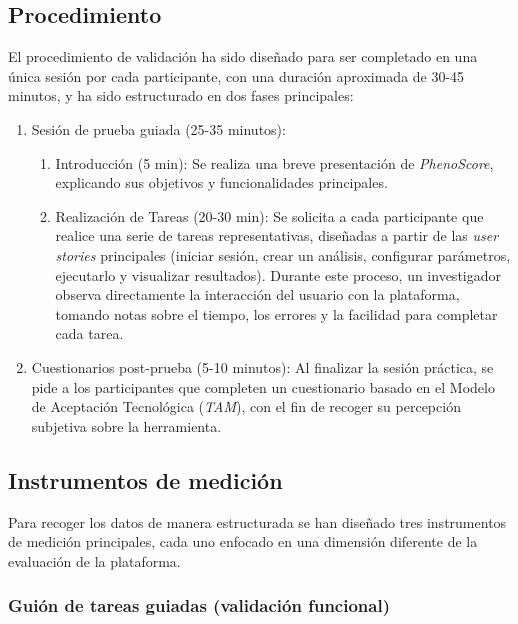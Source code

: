 \subsection{Procedimiento}

El procedimiento de validación ha sido diseñado para ser completado en una única sesión por cada participante, con una duración aproximada de 30-45 minutos, y ha sido estructurado en dos fases principales:

\begin{enumerate}
    \item Sesión de prueba guiada (25-35 minutos):
    \begin{enumerate}
    \item Introducción (5 min): Se realiza una breve presentación de \textit{PhenoScore}, explicando sus objetivos y funcionalidades principales.
    \item Realización de Tareas (20-30 min): Se solicita a cada participante que realice una serie de tareas representativas, diseñadas a partir de las \textit{user stories} principales (iniciar sesión, crear un análisis, configurar parámetros, ejecutarlo y visualizar resultados). Durante este proceso, un investigador observa directamente la interacción del usuario con la plataforma, tomando notas sobre el tiempo, los errores y la facilidad para completar cada tarea.
    \end{enumerate}
    \item Cuestionarios post-prueba (5-10 minutos):
    Al finalizar la sesión práctica, se pide a los participantes que completen un cuestionario basado en el Modelo de Aceptación Tecnológica (\textit{TAM}), con el fin de recoger su percepción subjetiva sobre la herramienta.
\end{enumerate}


\subsection{Instrumentos de medición}

Para recoger los datos de manera estructurada se han diseñado tres instrumentos de medición principales, cada uno enfocado en una dimensión diferente de la evaluación de la plataforma.

\subsubsection{Guión de tareas guiadas (validación funcional)}


